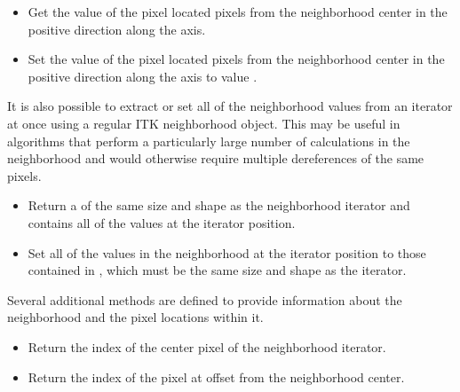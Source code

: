{\begin{itemize}
\item \textbf{} Get the
value of the pixel located  pixels from the neighborhood center in the positive
direction along the  axis.
 
\item \textbf{}  
Set the value of the pixel located  pixels from the neighborhood center
in the positive direction along the  axis to value .

\end{itemize}

It is also possible to extract or set all of the neighborhood values from an iterator
at once using a regular ITK neighborhood object.  This may be useful in
algorithms that perform a particularly large number of calculations in the
neighborhood and would otherwise require multiple dereferences of the same pixels.

\begin{itemize}

\item \textbf{} Return a
 of the same size and shape as the neighborhood
iterator and contains all of the values at the iterator position.

\item \textbf{} Set all
of the values in the neighborhood at the iterator position to those contained
in , which must be the same size and shape as the iterator.

\end{itemize}

Several additional methods are defined to provide information about the
neighborhood and the pixel locations within it.

\begin{itemize}

\item \textbf{} Return the 
index of the center pixel of the neighborhood iterator.

\item \textbf{} Return the
 index of the pixel at offset  from the neighborhood center.


\end{itemize}}
